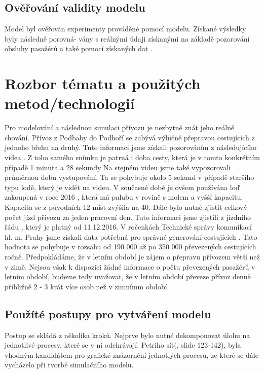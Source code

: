 \documentclass[11pt,a4paper]{article}
\begin{document}
	\subsection{Ověřování validity modelu}
  Model byl ověřován experimenty prováděné pomocí modelu. Získané výsledky byly následně porovná-
  vány s reálnými údaji získanými na základě pozorování obsluhy pasažérů \cite{DELKA_CESTY} a také pomocí získaných dat \cite{ROCENKY}. 

	\section{Rozbor tématu a použitých metod/technologií}
  Pro modelování a následnou simulaci přívozu je nezbytné znát jeho reálné chování.
  Přívoz z Podbaby do Podhoří se zabývá výlučně přepravou cestujících z jednoho
  břehu na druhý. Tuto informaci jsme získali pozorováním z následujícího videa \cite{DELKA_CESTY}.
  Z toho samého snímku je patrná i doba cesty, která je v tomto konkrétním případě 1 minuta a 28 sekundy
  Na stejném videu jsme také vypozorovali průměrnou dobu vystupování. Ta se pohybuje
  okolo 5 sekund v případě staršího typu lodě, který je vidět na videu. V současné době je ovšem používána loď zakoupená
  v roce 2016 \cite{LOD}, která má palubu v rovině s molem a vyšší kapacitu. Kapacita se z původních 12 míst zvýšila na
  40. Dále bylo nutné zjistit celkový počet jízd přívozu za jeden pracovní den. Tuto informaci
  jsme zjistili z jízdního řádu \cite{PID}, který je platný od 11.12.2016.
  V ročenkách Technické správy komunikací hl. m. Prahy jsme získali data potřebná pro
  správné generování cestujících \cite{ROCENKY}. Tato hodnota se pohybuje v rozsahu od 190 000
  až po 350 000 převezených cestujících ročně. Předpokládáme, že v letním období je
  zájem o přepravu přívozem větší než v zimě. Nejsou však k dispozici žádné informace o
  počtu převezených pasažérů v letním období, budeme tedy uvažovat, že v letním období
  převeze přívoz denně přibližně 2 - 3 krát více osob než v zimnímm období.

  \subsection{Použíté postupy pro vytváření modelu}
  Postup se skládá z několika kroků. Nejprve bylo nutné dekomponovat úlohu na jednotlivé procesy,
  které se v ní odehrávají. Petriho síť(\cite{SLAJD}, slide 123-142), byla vhodným kandidátem pro grafické znázornění
  jednotlých procesů, ze které se dále vycházelo při tvorbě simulačního modelu.
\end{document}
